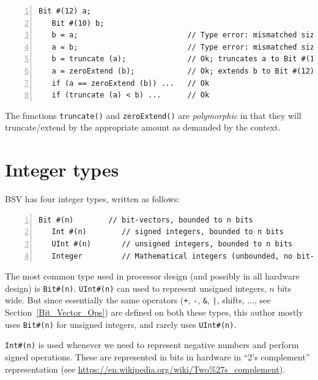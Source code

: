 {\small
\begin{Verbatim}[frame=single, numbers=left]
   Bit #(12) a;
   Bit #(10) b;
   b = a;                         // Type error: mismatched sizes
   a = b;                         // Type error: mismatched sizes
   b = truncate (a);              // Ok; truncates a to Bit #(10), then assigns
   a = zeroExtend (b);            // Ok; extends b to Bit #(12), then assigns
   if (a == zeroExtend (b)) ...   // Ok
   if (truncate (a) < b) ...      // Ok
\end{Verbatim}
}

The functions \verb|truncate()| and \verb|zeroExtend()| are
\emph{polymorphic} in that they will truncate/extend by the
appropriate amount as demanded by the context.


\section{Integer types}

\label{BSV_ints}


BSV has four integer types, written as follows:

{\small
\begin{Verbatim}[frame=single, numbers=left]
   Bit #(n)        // bit-vectors, bounded to n bits
   Int #(n)        // signed integers, bounded to n bits
   UInt #(n)       // unsigned integers, bounded to n bits
   Integer         // Mathematical integers (unbounded, no bit-width limit)
\end{Verbatim}
}

The most common type used in processor design (and possibly in all
hardware design) is \verb|Bit#(n)|.  \verb|UInt#(n)| can used to
represent unsigned integers, $n$ bits wide.  But since essentially the
same operators (\verb|+|, \verb|-|, \verb|&|, \verb'|', shifts, ...,
see Section~\ref{Bit_Vector_Ops}) are defined on both these types,
this author mostly uses \verb|Bit#(n)| for unsigned integers, and
rarely uses \verb|UInt#(n)|.

\verb|Int#(n)| is used whenever we need to represent negative numbers
and perform signed operations.  These are represented in bits in
hardware in ``2's complement'' representation (see
\url{https://en.wikipedia.org/wiki/Two%27s_complement}).


